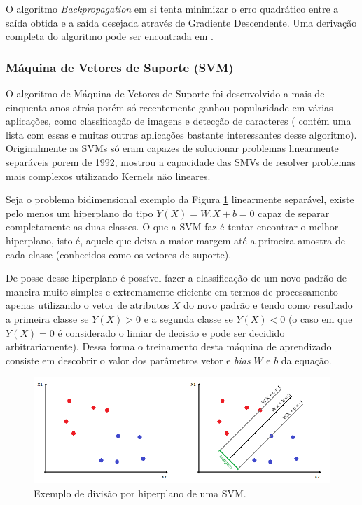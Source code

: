 \documentclass[12pt]{article}
\begin{document}
            O algoritmo \textit{Backpropagation} em si tenta minimizar o erro quadrático entre a saída obtida e a saída desejada através de Gradiente Descendente. Uma derivação completa do algoritmo pode ser encontrada em \cite{machineLearning1997}.
            
            \subsubsection{Máquina de Vetores de Suporte (SVM)}
            \label{sec:SVM}

            O algoritmo de Máquina de Vetores de Suporte foi desenvolvido a mais de cinquenta anos atrás porém só recentemente ganhou popularidade em várias aplicações, como classificação de imagens e detecção de caracteres (\cite{applicationsSVM} contém uma lista com essas e muitas outras aplicações bastante interessantes desse algoritmo). Originalmente as SVMs só eram capazes de solucionar problemas linearmente separáveis porem \cite{svm1992} de 1992, mostrou a capacidade das SMVs de resolver problemas mais complexos utilizando Kernels não lineares.
            
            Seja o problema bidimensional exemplo da Figura \ref{fig:SVM} linearmente separável, existe pelo menos um hiperplano do tipo $Y(X) = W.X + b = 0$ capaz de separar completamente as duas classes. O que a SVM faz é tentar encontrar o melhor hiperplano, isto é, aquele que deixa a maior margem até a primeira amostra de cada classe (conhecidos como os vetores de suporte).
            
            De posse desse hiperplano é possível fazer a classificação de um novo padrão de maneira muito simples e extremamente eficiente em termos de processamento apenas utilizando o vetor de atributos $X$ do novo padrão e tendo como resultado a primeira classe se $Y(X) > 0$ e a segunda classe se $Y(X) < 0$ (o caso em que $Y(X) = 0$ é considerado o limiar de decisão e pode ser decidido arbitrariamente). Dessa forma o treinamento desta máquina de aprendizado consiste em descobrir o valor dos parâmetros vetor e \textit{bias} $W$ e $b$ da equação.
            
            \begin{figure}[H]
            \centering
            \includegraphics[width=16cm]{images/SVM.png}\par
            \caption{Exemplo de divisão por hiperplano de uma SVM.}
            \label{fig:SVM}
            \end{figure}
            
\end{document}
